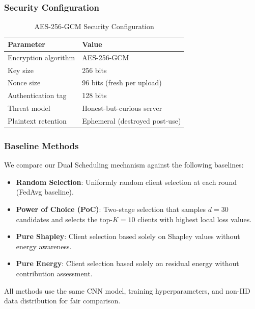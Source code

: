 \subsubsection{Security Configuration}

\begin{table}[h]
\centering
\caption{AES-256-GCM Security Configuration}
\begin{tabular}{ll}
\hline
\textbf{Parameter} & \textbf{Value} \\
\hline
Encryption algorithm & AES-256-GCM \\
Key size & 256 bits \\
Nonce size & 96 bits (fresh per upload) \\
Authentication tag & 128 bits \\
Threat model & Honest-but-curious server \\
Plaintext retention & Ephemeral (destroyed post-use) \\
\hline
\end{tabular}
\end{table}

\subsubsection{Baseline Methods}

We compare our Dual Scheduling mechanism against the following baselines:

\begin{itemize}
\item \textbf{Random Selection}: Uniformly random client selection at each round (FedAvg baseline).
\item \textbf{Power of Choice (PoC)}: Two-stage selection that samples $d=30$ candidates and selects the top-$K=10$ clients with highest local loss values.
\item \textbf{Pure Shapley}: Client selection based solely on Shapley values without energy awareness.
\item \textbf{Pure Energy}: Client selection based solely on residual energy without contribution assessment.
\end{itemize}

All methods use the same CNN model, training hyperparameters, and non-IID data distribution for fair comparison.
